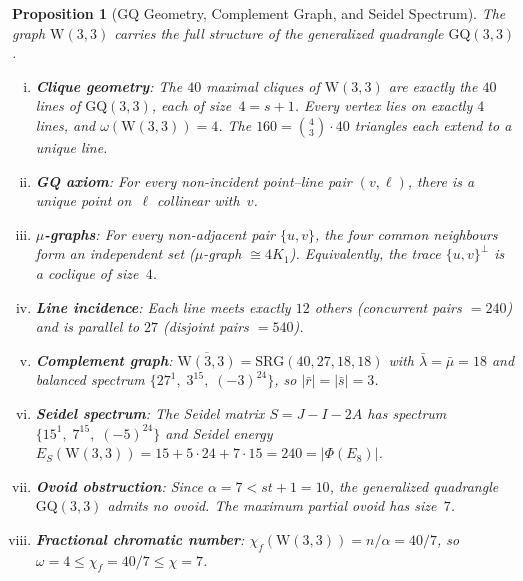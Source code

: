 \documentclass[12pt,a4paper]{article}
\newtheorem{proposition}[theorem]{Proposition}
\newcommand{\W}{\mathrm{W}(3,3)}
\begin{document}
\begin{proposition}[GQ Geometry, Complement Graph, and Seidel Spectrum]\label{prop:gqgeometry-extended}
The graph $\W$ carries the full structure of the generalized quadrangle
$\mathrm{GQ}(3,3)$.
\begin{enumerate}[(i)]
  \item \textbf{Clique geometry}:  The $40$ maximal cliques of $\W$ are
        exactly the $40$ lines of $\mathrm{GQ}(3,3)$, each of size~$4 = s{+}1$.
        Every vertex lies on exactly $4$ lines, and $\omega(\W) = 4$.
        The $160 = \binom{4}{3}\!\cdot\!40$ triangles each extend to a
        unique line.
  \item \textbf{GQ axiom}:  For every non-incident point--line pair
        $(v, \ell)$, there is a unique point on~$\ell$ collinear with~$v$.
  \item \textbf{$\mu$-graphs}:  For every non-adjacent pair $\{u,v\}$,
        the four common neighbours form an independent set
        ($\mu$-graph $\cong 4K_1$).  Equivalently, the trace
        $\{u,v\}^{\!\perp}$ is a coclique of size~$4$.
  \item \textbf{Line incidence}:  Each line meets exactly $12$ others
        (concurrent pairs $= 240$) and is parallel to $27$
        (disjoint pairs $= 540$). %
  \item \textbf{Complement graph}:
        $\overline{\W} = \mathrm{SRG}(40, 27, 18, 18)$ with
        $\bar\lambda = \bar\mu = 18$ and balanced spectrum
        $\{27^1,\; 3^{15},\; (-3)^{24}\}$, so $|\bar r| = |\bar s| = 3$.
  \item \textbf{Seidel spectrum}:
        The Seidel matrix $S = J - I - 2A$ has spectrum
        $\{15^1,\; 7^{15},\; (-5)^{24}\}$ and Seidel energy
        $E_S(\W) = 15 + 5 \cdot 24 + 7 \cdot 15 = 240 = |\Phi(E_8)|$.
  \item \textbf{Ovoid obstruction}:
        Since $\alpha = 7 < st + 1 = 10$, the generalized quadrangle
        $\mathrm{GQ}(3,3)$ admits no ovoid.
        The maximum partial ovoid has size~$7$.
  \item \textbf{Fractional chromatic number}:
        $\chi_f(\W) = n / \alpha = 40/7$, so
        $\omega = 4 \le \chi_f = 40/7 \le \chi = 7$.
\end{enumerate}
\end{proposition}
\end{document}
